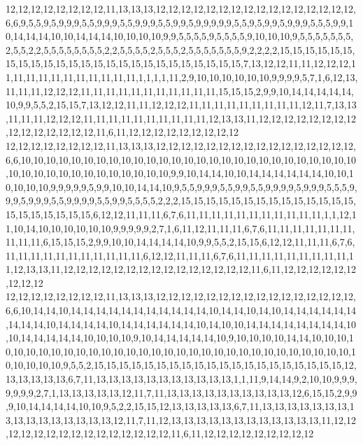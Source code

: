 12,12,12,12,12,12,12,12,11,13,13,13,12,12,12,12,12,12,12,12,12,12,12,12,12,12,12,12,6,6,9,5,5,9,5,9,9,9,5,5,9,9,9,5,5,9,9,9,5,5,9,9,5,9,9,9,9,9,5,5,9,5,9,9,5,9,9,9,5,5,5,9,9,10,14,14,14,10,10,14,14,14,10,10,10,10,9,9,5,5,5,5,9,5,5,5,5,9,10,10,10,9,5,5,5,5,5,5,5,2,5,5,2,2,5,5,5,5,5,5,5,5,2,2,5,5,5,5,2,5,5,5,2,5,5,5,5,5,5,5,9,2,2,2,2,15,15,15,15,15,15,15,15,15,15,15,15,15,15,15,15,15,15,15,15,15,15,15,15,15,7,13,12,12,11,11,12,12,12,11,11,11,11,11,11,11,11,11,11,11,1,1,1,1,11,2,9,10,10,10,10,10,10,9,9,9,9,5,7,1,6,12,13,11,11,11,12,12,12,11,11,11,11,11,11,11,11,11,11,11,15,15,15,2,9,9,10,14,14,14,14,14,10,9,9,5,5,2,15,15,7,13,12,12,11,11,12,12,12,11,11,11,11,11,11,11,11,11,12,11,7,13,13,11,11,11,12,12,12,11,11,11,11,11,11,11,11,11,11,12,13,13,11,12,12,12,12,12,12,12,12,12,12,12,12,12,12,12,11,6,11,12,12,12,12,12,12,12,12,12
12,12,12,12,12,12,12,12,11,13,13,13,12,12,12,12,12,12,12,12,12,12,12,12,12,12,12,12,6,6,10,10,10,10,10,10,10,10,10,10,10,10,10,10,10,10,10,10,10,10,10,10,10,10,10,10,10,10,10,10,10,10,10,10,10,10,10,10,10,10,9,9,10,14,14,10,10,14,14,14,14,14,14,10,10,10,10,10,10,9,9,9,9,9,5,9,9,10,10,14,14,10,9,5,5,9,9,9,5,5,9,9,5,5,9,9,9,9,5,9,9,9,5,5,5,9,9,9,5,9,9,9,5,5,9,9,9,9,5,5,9,9,5,5,5,5,2,2,2,15,15,15,15,15,15,15,15,15,15,15,15,15,15,15,15,15,15,15,15,15,6,12,12,11,11,11,6,7,6,11,11,11,11,11,11,11,11,11,11,11,1,1,12,11,10,14,10,10,10,10,10,10,9,9,9,9,9,2,7,1,6,11,12,11,11,11,6,7,6,11,11,11,11,11,11,11,11,11,11,6,15,15,15,2,9,9,10,10,14,14,14,14,10,9,9,5,5,2,15,15,6,12,12,11,11,11,6,7,6,11,11,11,11,11,11,11,11,11,11,11,6,12,12,11,11,11,6,7,6,11,11,11,11,11,11,11,11,11,11,12,13,13,11,12,12,12,12,12,12,12,12,12,12,12,12,12,12,12,11,6,11,12,12,12,12,12,12,12,12,12
12,12,12,12,12,12,12,12,11,13,13,13,12,12,12,12,12,12,12,12,12,12,12,12,12,12,12,12,6,6,10,14,14,10,14,14,14,14,14,14,14,14,14,14,14,10,14,14,10,14,10,14,14,14,14,14,14,14,14,14,10,14,14,14,14,10,14,14,14,14,14,14,10,14,10,10,14,14,14,14,14,14,14,14,10,10,14,14,14,14,14,10,10,10,10,9,10,14,14,14,14,14,10,9,10,10,10,10,14,14,10,10,10,10,10,10,10,10,10,10,10,10,10,10,10,10,10,10,10,10,10,10,10,10,10,10,10,10,10,10,10,10,10,10,10,10,9,5,5,2,15,15,15,15,15,15,15,15,15,15,15,15,15,15,15,15,15,15,15,15,12,13,13,13,13,13,6,7,11,13,13,13,13,13,13,13,13,13,13,13,1,1,11,9,14,14,9,2,10,10,9,9,9,9,9,9,9,2,7,1,13,13,13,13,13,12,11,7,11,13,13,13,13,13,13,13,13,13,13,12,6,15,15,2,9,9,9,10,14,14,14,14,10,10,9,5,2,2,15,15,12,13,13,13,13,13,6,7,11,13,13,13,13,13,13,13,13,13,13,13,13,13,13,13,13,12,11,7,11,12,13,13,13,13,13,13,13,13,13,13,13,13,11,12,12,12,12,12,12,12,12,12,12,12,12,12,12,12,11,6,11,12,12,12,12,12,12,12,12,12
